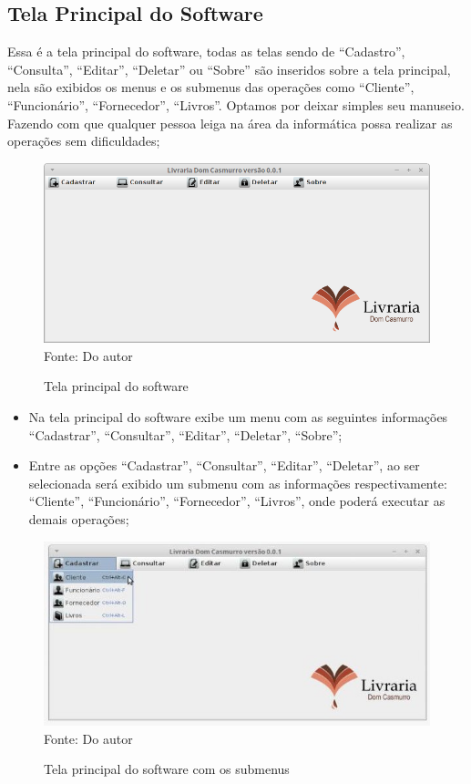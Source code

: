 \subsection{Tela Principal do Software}

 Essa é a tela principal do software, todas as telas sendo de “Cadastro”, “Consulta”, “Editar”, “Deletar” ou “Sobre” 
 são inseridos sobre a tela principal, nela são exibidos os menus e os submenus das operações como “Cliente”, “Funcionário”,
 “Fornecedor”, “Livros”. Optamos por deixar  simples seu manuseio. Fazendo com que qualquer pessoa leiga na área da informática
 possa realizar as operações sem dificuldades;
 
 \begin{figure}[H]
	\centering 
	\caption{Tela principal do software}
	\label{tela-principal}
	\includegraphics[scale = 0.6]{imagens/tela-principal.png}
	\\Fonte: Do autor
\end{figure}
 
 
 \begin{itemize}
  \item Na tela principal do software exibe um menu com as seguintes informações “Cadastrar”, “Consultar”, “Editar”,
  “Deletar”, “Sobre”;
  
  \item Entre as opções  “Cadastrar”, “Consultar”, “Editar”, “Deletar”,  ao ser selecionada será exibido um submenu com as 
  informações respectivamente:   “Cliente”, “Funcionário”, “Fornecedor”, “Livros”, onde poderá executar as demais operações;
 \end{itemize}
 
 
 \begin{figure}[H]
	\centering 
	\caption{Tela principal do software com os submenus}
	\label{principal-menu}
	\includegraphics[scale = 0.8]{imagens/tela-principal-menu.jpg}
	\\Fonte: Do autor
\end{figure}



